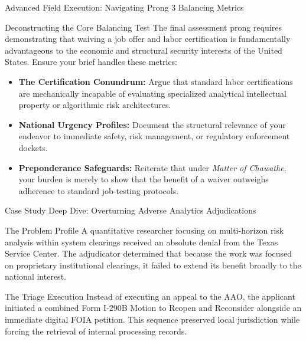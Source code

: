 \documentclass[11pt]{beamer}
\begin{document}
	\begin{frame}{Advanced Field Execution: Navigating Prong 3 Balancing Metrics}
		\scriptsize
		\begin{block}{Deconstructing the Core Balancing Test}
			The final assessment prong requires demonstrating that waiving a job offer and labor certification is fundamentally advantageous to the economic and structural security interests of the United States. Ensure your brief handles these metrics:
			\begin{itemize}
				\item \textbf{The Certification Conundrum:} Argue that standard labor certifications are mechanically incapable of evaluating specialized analytical intellectual property or algorithmic risk architectures.
				\item \textbf{National Urgency Profiles:} Document the structural relevance of your endeavor to immediate safety, risk management, or regulatory enforcement dockets.
				\item \textbf{Preponderance Safeguards:} Reiterate that under \textit{Matter of Chawathe}, your burden is merely to show that the benefit of a waiver outweighs adherence to standard job-testing protocols.
			\end{itemize}
		\end{block}
	\end{frame}
	
	
	\begin{frame}{Case Study Deep Dive: Overturning Adverse Analytics Adjudications}
		\scriptsize
		\begin{block}{The Problem Profile}
			A quantitative researcher focusing on multi-horizon risk analysis within system clearings received an absolute denial from the Texas Service Center. The adjudicator determined that because the work was focused on proprietary institutional clearings, it failed to extend its benefit broadly to the national interest.
		\end{block}
		\begin{block}{The Triage Execution}
			Instead of executing an appeal to the AAO, the applicant initiated a combined Form I-290B Motion to Reopen and Reconsider alongside an immediate digital FOIA petition. This sequence preserved local jurisdiction while forcing the retrieval of internal processing records.
		\end{block}
	\end{frame}
	
\end{document}
